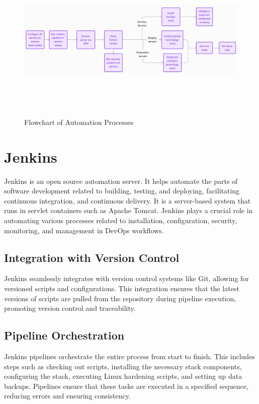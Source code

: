 \documentclass[12pt,a4paper,oneside]{report}
\begin{document}
\begin{figure}[ht]
    \centering
    \includegraphics[width= 180mm, height = 80mm]{images/flowchart.png}
    \caption{Flowchart of Automation Processes}
    \label{fig:figure2_2}
\end{figure}
\section{Jenkins}
\par  Jenkins is an open source automation server. It helps automate the parts of software development related to building, testing, and deploying, facilitating continuous integration, and continuous delivery. It is a server-based system that runs in servlet containers such as Apache Tomcat. Jenkins plays a crucial role in automating various processes related to installation, configuration, security, monitoring, and management in DevOps workflows.

\subsection{Integration with Version Control}
\hspace{1cm} Jenkins seamlessly integrates with version control systems like Git, allowing for versioned scripts and configurations. This integration ensures that the latest versions of scripts are pulled from the repository during pipeline execution, promoting version control and traceability.

\subsection{Pipeline Orchestration}
\hspace{1cm} Jenkins pipelines orchestrate the entire process from start to finish. This includes steps such as checking out scripts, installing the necessary stack components, configuring the stack, executing Linux hardening scripts, and setting up data backups. Pipelines ensure that these tasks are executed in a specified sequence, reducing errors and ensuring consistency.
\end{document}
